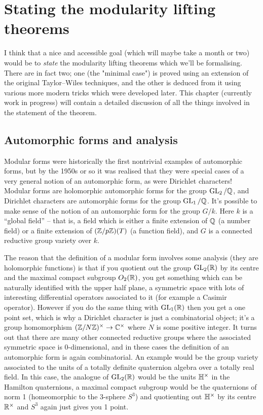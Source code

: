 \chapter{Stating the modularity lifting theorems}

I think that a nice and accessible goal (which will maybe take a month or two) would be to
\emph{state} the modularity lifting theorems which we'll be formalising. There are in fact two;
one (the "minimal case") is proved using an extension of the original Taylor--Wiles techniques, and
the other is deduced from it using various more modern tricks which were developed later. This
chapter (currently work in progress) will contain a detailed discussion of all the things
involved in the statement of the theorem.

\section{Automorphic forms and analysis}

Modular forms were historically the first nontrivial examples of automorphic forms, but by the
1950s or so it was realised that they were special cases of a very general notion of an automorphic
form, as were Dirichlet characters! Modular forms are holomorphic automorphic forms for the group
$\operatorname{GL}_2/\mathbb{Q}$, and Dirichlet characters are automorphic forms for the group $\operatorname{GL}_1/\mathbb{Q}$. It's possible
to make sense of the notion of an automorphic form for the group $G/k$. Here $k$ is
a ``global field'' -- that is, a field which is either a finite extension of $\mathbb{Q}$ (a number field)
or a finite extension of $(\mathbb{Z}/p\mathbb{Z})(T)$ (a function field), and $G$ is a connected reductive
group variety over $k$.

The reason that the definition of a modular form involves some analysis (they are holomorphic
functions) is that if you quotient out the group $\operatorname{GL}_2(\mathbb{R})$ by its centre and the maximal compact
subgroup $O_2(\mathbb{R})$, you get something which can be naturally identified with the upper half plane, a
symmetric space with lots of interesting differential operators associated to it (for example a
Casimir operator). However if you do the same thing with $\operatorname{GL}_1(\mathbb{R})$ then you get a one point set,
which is why a Dirichlet character is just a combinatorial object; it's a group homomorphism
$(\mathbb{Z}/N\mathbb{Z})^\times\to\mathbb{C}^\times$ where $N$ is some positive integer. It turns out that there are many
other connected reductive groups where the associated symmetric space is 0-dimensional, and in these
cases the definition of an automorphic form is again combinatorial. An example would be the group
variety associated to the units of a totally definite quaternion algebra over a totally real field.
In this case, the analogue of $\operatorname{GL}_2(\mathbb{R})$ would be the units $\mathbb{H}^\times$ in the Hamilton
quaternions, a maximal compact subgroup would be the quaternions of norm 1 (homeomorphic to the
3-sphere $S^3$) and quotienting out $\mathbb{H}^\times$ by its centre $\mathbb{R}^\times$ and $S^3$ again just
gives you 1 point.

